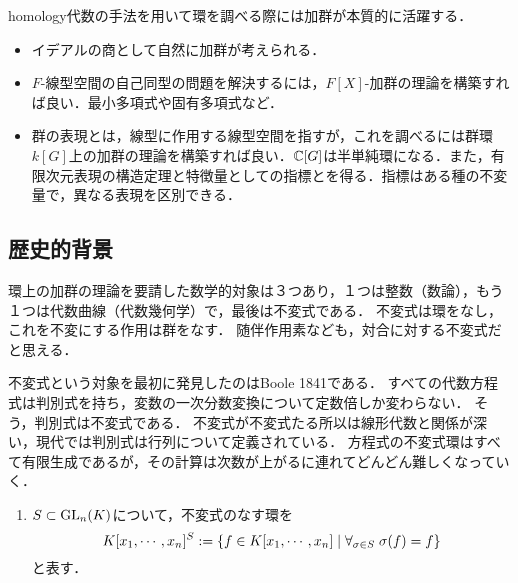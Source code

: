 \documentclass[uplatex,dvipdfmx]{jsreport}
\begin{document}
\begin{tcolorbox}[colframe=ForestGreen, colback=ForestGreen!10!white,breakable,colbacktitle=ForestGreen!40!white,coltitle=black,fonttitle=\bfseries\sffamily,
    title=]
    homology代数の手法を用いて環を調べる際には加群が本質的に活躍する．
    \begin{itemize}
        \item イデアルの商として自然に加群が考えられる．
        \item $F$-線型空間の自己同型の問題を解決するには，$F[X]$-加群の理論を構築すれば良い．最小多項式や固有多項式など．
        \item 群の表現とは，線型に作用する線型空間を指すが，これを調べるには群環$k[G]$上の加群の理論を構築すれば良い．$\mathbb{C}[G]$は半単純環になる．また，有限次元表現の構造定理と特徴量としての指標とを得る．指標はある種の不変量で，異なる表現を区別できる．
    \end{itemize}
\end{tcolorbox}


\subsection{歴史的背景}

\begin{tcolorbox}[colframe=ForestGreen, colback=ForestGreen!10!white,breakable,colbacktitle=ForestGreen!40!white,coltitle=black,fonttitle=\bfseries\sffamily,
title=]
    環上の加群の理論を要請した数学的対象は３つあり，１つは整数（数論），もう１つは代数曲線（代数幾何学）で，最後は不変式である．
    不変式は環をなし，これを不変にする作用は群をなす．
    随伴作用素なども，対合に対する不変式だと思える．
\end{tcolorbox}

\begin{history}
    不変式という対象を最初に発見したのはBoole 1841である．
    すべての代数方程式は判別式を持ち，変数の一次分数変換について定数倍しか変わらない．
    そう，判別式は不変式である．
    不変式が不変式たる所以は線形代数と関係が深い，現代では判別式は行列について定義されている．
    方程式の不変式環はすべて有限生成であるが，その計算は次数が上がるに連れてどんどん難しくなっていく．
\end{history}

\begin{definition}\mbox{}
    \begin{enumerate}
        \item $S\subset\mathrm{GL}_n(K)$について，不変式のなす環を
        \[K[x_1,\cdots,x_n]^S:=\left\{f\in K[x_1,\cdots,x_n]\mid\forall_{\sigma\in S}\;\sigma(f)=f\right\}\]
        と表す．
    \end{enumerate}
\end{definition}
\end{document}
